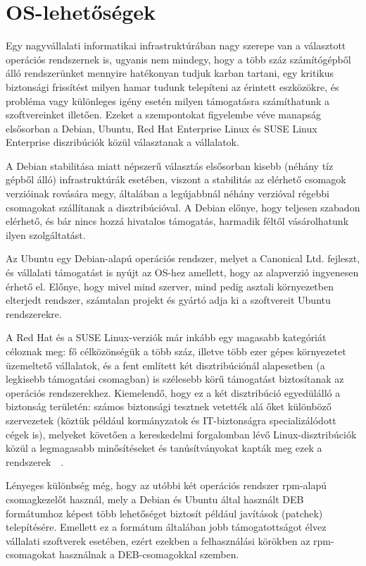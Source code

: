 \section{OS-lehetőségek} \label{sect:os}
Egy nagyvállalati informatikai infrastruktúrában nagy szerepe van a választott operációs rendszernek is, ugyanis nem mindegy, hogy a több száz számítógépből álló rendszerünket mennyire hatékonyan tudjuk karban tartani, egy kritikus biztonsági frissítést milyen hamar tudunk telepíteni az érintett eszközökre, és probléma vagy különleges igény esetén milyen támogatásra számíthatunk a szoftvereinket illetően.
Ezeket a szempontokat figyelembe véve manapság elsősorban a Debian, Ubuntu, Red Hat Enterprise Linux és SUSE Linux Enterprise diszribúciók közül választanak a vállalatok.

A Debian stabilitása miatt népszerű választás elsősorban kisebb (néhány tíz gépből álló) infrastruktúrák esetében, viszont a stabilitás az elérhető csomagok verzióinak rovására megy, általában a legújabbnál néhány verzióval régebbi csomagokat szállítanak a disztribúcióval. A Debian előnye, hogy teljesen szabadon elérhető, és bár nincs hozzá hivatalos támogatás, harmadik féltől vásárolhatunk ilyen szolgáltatást.

Az Ubuntu egy Debian-alapú operációs rendszer, melyet a Canonical Ltd. fejleszt, és vállalati támogatást is nyújt az OS-hez amellett, hogy az alapverzió ingyenesen érhető el. Előnye, hogy mivel mind szerver, mind pedig asztali környezetben elterjedt rendszer, számtalan projekt és gyártó adja ki a szoftvereit Ubuntu rendszerekre.

A Red Hat és a SUSE Linux-verziók már inkább egy magasabb kategóriát céloznak meg: fő célközönségük a több száz, illetve több ezer gépes környezetet üzemeltető vállalatok, és a fent említett két disztribúciónál alapesetben (a legkisebb támogatási csomagban) is szélesebb körű támogatást biztosítanak az operációs rendszerekhez. Kiemelendő, hogy ez a két disztribúció egyedülálló a biztonság területén: számos biztonsági tesztnek vetették alá őket különböző szervezetek (köztük például kormányzatok és IT-biztonságra specializálódott cégek is), melyeket követően a kereskedelmi forgalomban lévő Linux-disztribúciók közül a legmagasabb minősítéseket és tanúsítványokat kapták meg ezek a rendszerek~\cite{RhSec}~\cite{SlesSec}.

Lényeges különbség még, hogy az utóbbi két operációs rendszer \acrshort{rpm}-alapú csomagkezelőt használ, mely a Debian és Ubuntu által használt DEB formátumhoz képest több lehetőséget biztosít például javítások (patchek) telepítésére. Emellett ez a formátum általában jobb támogatottságot élvez vállalati szoftverek esetében, ezért ezekben a felhasználási körökben az \acrshort{rpm}-csomagokat használnak a DEB-csomagokkal szemben.


